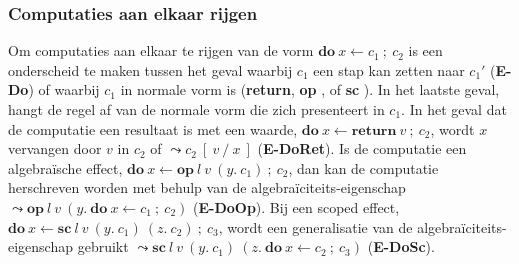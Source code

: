 \subsubsection{Computaties aan elkaar rijgen}
Om computaties aan elkaar te rijgen van de vorm $\textbf{do}\:x \leftarrow c_{1}\:;\:c_{2}$ is een onderscheid te maken tussen het geval waarbij $c_{1}$ een stap kan zetten naar $c_{1}'$ (\textbf{E-Do}) of waarbij $c_{1}$ in normale vorm is (\textbf{return}, \textbf{op \textellipsis}, of \textbf{sc \textellipsis}). In het laatste geval, hangt de regel af van de normale vorm die zich presenteert in $c_{1}$. In het geval dat de computatie een resultaat is met een waarde, $\textbf{do}\:x \leftarrow \textbf{return}\:v\:;\:c_{2}$, wordt $x$ vervangen door $v$ in $c_{2}$ of $\leadsto c_{2}\:[\:v\:/\:x\:]$ (\textbf{E-DoRet}). Is de computatie een algebraïsche effect, $\textbf{do}\:x \leftarrow \textbf{op}\:l\:v\:(y.\:c_{1})\:;\:c_{2}$, dan kan de computatie herschreven worden met behulp van de algebraïciteits-eigenschap $\leadsto \textbf{op}\:l\:v\:(y.\: \textbf{do} \: x \leftarrow c_{1}\:;\:c_{2})$ (\textbf{E-DoOp}). Bij een scoped effect, $\textbf{do}\:x \leftarrow \textbf{sc} \:l\:v\:(y.\:c_{1})\:(z.\:c_{2}) \: ;\: c_{3}$, wordt een generalisatie van de algebraïciteits-eigenschap gebruikt $\leadsto \textbf{sc} \:l\:v\:(y.\:c_{1})\:(z.\: \textbf{do} \: x \leftarrow c_{2} \: ;\: c_{3})$ (\textbf{E-DoSc}).


